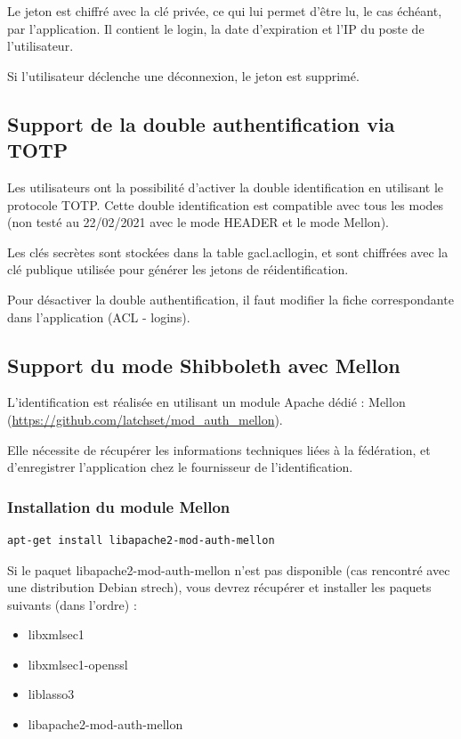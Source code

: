 Le jeton est chiffré avec la clé privée, ce qui lui permet d'être lu, le cas échéant, par l'application. Il contient le login, la date d'expiration et l'IP du poste de l'utilisateur. 

Si l'utilisateur déclenche une déconnexion, le jeton est supprimé.

\subsection{Support de la double authentification via TOTP}

Les utilisateurs ont la possibilité d'activer la double identification en utilisant le protocole TOTP. Cette double identification est compatible avec tous les modes (non testé au 22/02/2021 avec le mode HEADER et le mode Mellon).

Les clés secrètes sont stockées dans la table gacl.acllogin, et sont chiffrées avec la clé publique utilisée pour générer les jetons de réidentification. 

Pour désactiver la double authentification, il faut modifier la fiche correspondante dans l'application (ACL - logins).

\subsection{Support du mode Shibboleth avec Mellon}

L’identification est réalisée en utilisant un module Apache dédié : Mellon \linebreak (\href{https://github.com/latchset/mod_auth_mellon}{https://github.com/latchset/mod\_auth\_mellon}).

Elle nécessite de récupérer les informations techniques liées à la fédération, et d’enregistrer l’application chez le fournisseur de l’identification.

\subsubsection{Installation du module Mellon}

\begin{lstlisting}
apt-get install libapache2-mod-auth-mellon
\end{lstlisting}


Si le paquet libapache2-mod-auth-mellon n’est pas disponible (cas rencontré avec une distribution Debian strech), vous devrez récupérer et installer les paquets suivants (dans l’ordre) :
\begin{itemize}
	\item libxmlsec1
	\item libxmlsec1-openssl
	\item liblasso3
	\item libapache2-mod-auth-mellon
\end{itemize}
    
